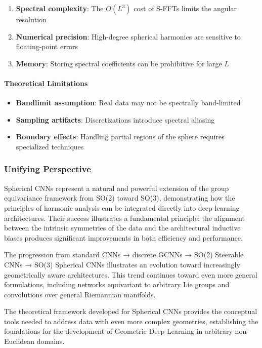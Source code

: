\begin{enumerate}
    \item \textbf{Spectral complexity}: The $O(L^3)$ cost of S-FFTs limits the angular resolution
    \item \textbf{Numerical precision}: High-degree spherical harmonics are sensitive to floating-point errors
    \item \textbf{Memory}: Storing spectral coefficients can be prohibitive for large $L$
\end{enumerate}

\paragraph{Theoretical Limitations}

\begin{itemize}
    \item \textbf{Bandlimit assumption}: Real data may not be spectrally band-limited
    \item \textbf{Sampling artifacts}: Discretizations introduce spectral aliasing
    \item \textbf{Boundary effects}: Handling partial regions of the sphere requires specialized techniques
\end{itemize}

\subsubsection{Unifying Perspective}

Spherical CNNs represent a natural and powerful extension of the group equivariance framework from SO(2) toward SO(3), demonstrating how the principles of harmonic analysis can be integrated directly into deep learning architectures. Their success illustrates a fundamental principle: the alignment between the intrinsic symmetries of the data and the architectural inductive biases produces significant improvements in both efficiency and performance.

The progression from standard \glspl{CNN} → discrete \glspl{GCNN} → SO(2) Steerable \glspl{CNN} → SO(3) Spherical \glspl{CNN} illustrates an evolution toward increasingly geometrically aware architectures. This trend continues toward even more general formulations, including networks equivariant to arbitrary Lie groups and convolutions over general Riemannian manifolds.

The theoretical framework developed for Spherical CNNs provides the conceptual tools needed to address data with even more complex geometries, establishing the foundations for the development of Geometric Deep Learning in arbitrary non-Euclidean domains.

